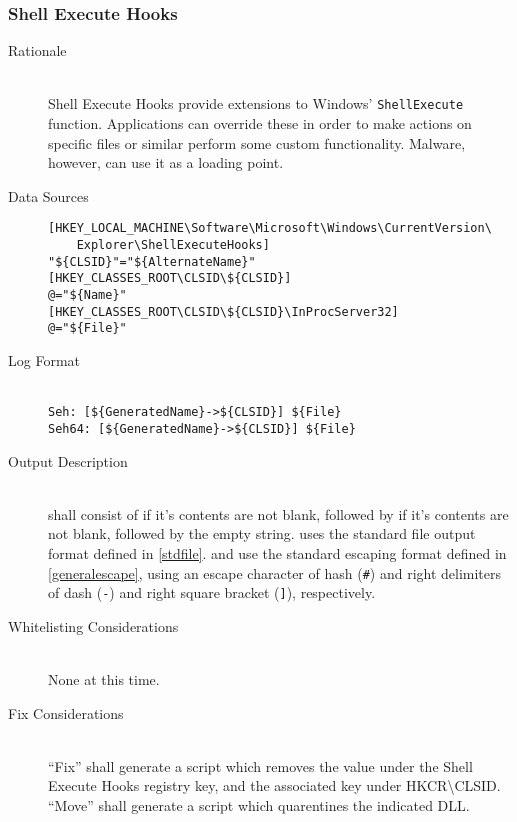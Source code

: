 \subsubsection{Shell Execute Hooks}
\begin{description}
\item[Rationale] \hfill \\
Shell Execute Hooks provide extensions to Windows' \verb|ShellExecute| function.
Applications can override these in order to make actions on specific files or
similar perform some custom functionality. Malware, however, can use it as a
loading point.
\item[Data Sources] \hfill
\vspace{-\baselineskip}
\begin{verbatim}
[HKEY_LOCAL_MACHINE\Software\Microsoft\Windows\CurrentVersion\
    Explorer\ShellExecuteHooks]
"${CLSID}"="${AlternateName}"
[HKEY_CLASSES_ROOT\CLSID\${CLSID}]
@="${Name}"
[HKEY_CLASSES_ROOT\CLSID\${CLSID}\InProcServer32]
@="${File}"
\end{verbatim}
\item[Log Format] \hfill \\
\verb|Seh: [${GeneratedName}->${CLSID}] ${File}| \\
\verb|Seh64: [${GeneratedName}->${CLSID}] ${File}|
\item[Output Description] \hfill \\
 shall consist of  if it's
contents are not blank, followed by  if it's contents are
not blank, followed by the empty string. \var{File} uses the standard file
output format defined in \ref{stdfile}. \var{GeneratedName} and \var{CLSID} use
the standard escaping format defined in \ref{generalescape}, using an escape
character of hash (\verb|#|) and right delimiters of dash (\verb|-|) and
right square bracket (\verb|]|), respectively.
\item[Whitelisting Considerations] \hfill \\
None at this time.
\item[Fix Considerations] \hfill \\
``Fix'' shall generate a script which removes the value under the
Shell Execute Hooks registry key, and the associated key under
HKCR\textbackslash{}CLSID.
``Move'' shall generate a script which quarentines the indicated DLL.
\end{description}

